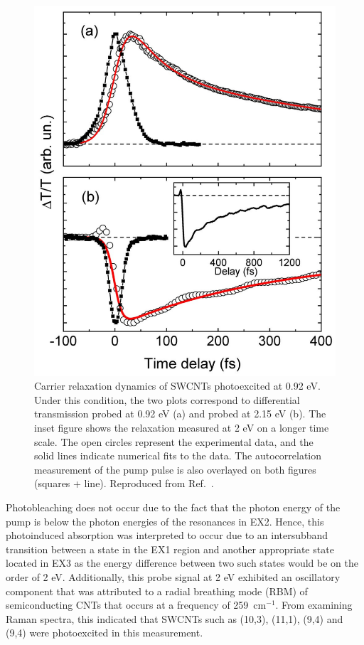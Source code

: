 \begin{figure}[H]
	\centering
	\includegraphics[scale=0.25]{images/chapter_prior_works/e11_pump_probe_manzoni}
	\caption{Carrier relaxation dynamics of SWCNTs photoexcited at 0.92 eV. Under this condition, the two plots correspond to differential transmission probed at 0.92 eV (a) and probed at 2.15 eV (b). The inset figure shows the relaxation measured at 2 eV on a longer time scale. The open circles represent the experimental data, and the solid lines indicate numerical fits to the data. The autocorrelation measurement of the pump pulse is also overlayed on both figures (squares + line). Reproduced from Ref.\ \cite{manzoni2005intersubband}.}
	\label{fig:e11_pump_manzoni}
\end{figure}

Photobleaching does not occur due to the fact that the photon energy of the pump is below the photon energies of the resonances in EX2. Hence, this photoinduced absorption was interpreted to occur due to an intersubband transition between a state in the EX1 region and another appropriate state located in EX3 as the energy difference between two such states would be on the order of 2 eV. Additionally, this probe signal at 2 eV exhibited an oscillatory component that was attributed to a radial breathing mode (RBM) of semiconducting CNTs that occurs at a frequency of 259~$\text{cm}^{-1}$. From examining Raman spectra, this indicated that SWCNTs such as (10,3), (11,1), (9,4) and (9,4) were photoexcited in this measurement.

